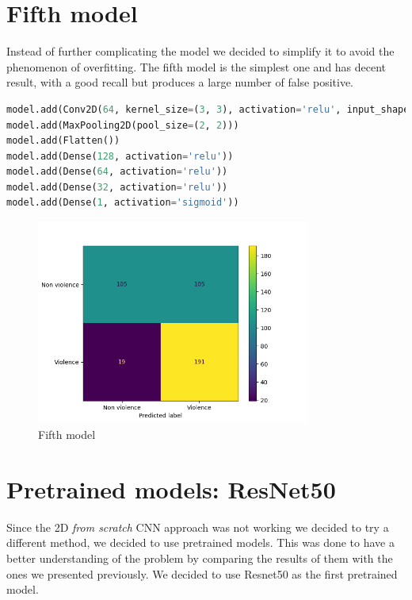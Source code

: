 \section{Fifth model}
Instead of further complicating the model we decided to simplify it to avoid the phenomenon of overfitting. The fifth model is the simplest one and has decent result, with a good recall but produces a large number of false positive.
\begin{lstlisting}[language=python, caption={Fifth model}, label={lst:Fifth model}]
model.add(Conv2D(64, kernel_size=(3, 3), activation='relu', input_shape=input_shape))
model.add(MaxPooling2D(pool_size=(2, 2)))
model.add(Flatten())
model.add(Dense(128, activation='relu'))
model.add(Dense(64, activation='relu'))
model.add(Dense(32, activation='relu'))
model.add(Dense(1, activation='sigmoid'))
\end{lstlisting}

\begin{figure}[]
    \centering
    \includegraphics[width=0.8\textwidth]{images/731a-2D10_inv-86ad-conf_matrix.png}
    \caption{Fifth model}
    \label{fig:Fifth model conf matrix}
\end{figure}

\section{Pretrained models: ResNet50}
Since the 2D \textit{from scratch} CNN approach was not working we decided to try a different method, we decided to use pretrained models. This was done to have a better understanding of the problem by comparing the results of them with the ones we presented previously. We decided to use Resnet50 as the first pretrained model. \\

